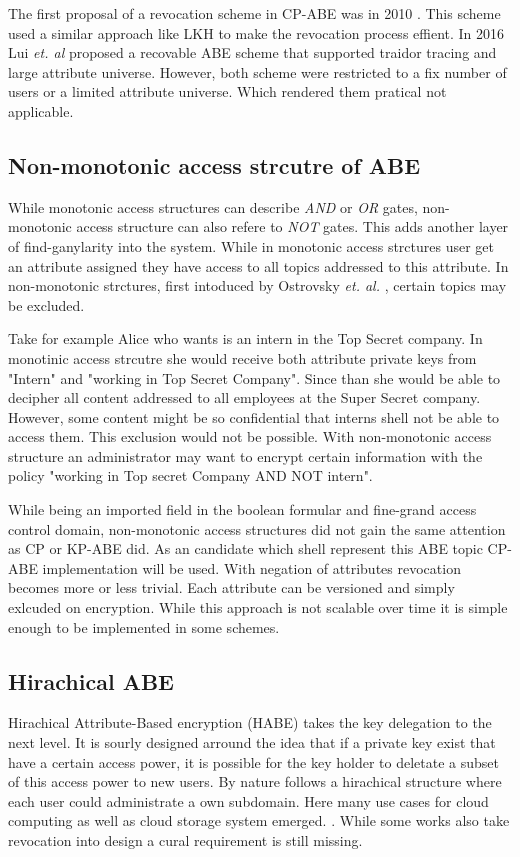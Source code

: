 The first proposal of a revocation scheme in CP-ABE was in 2010 \cite{liang2010ciphertext}. This scheme used a similar approach like LKH to make the revocation process effient. In 2016 Lui \textit{et. al} \cite{liu2016practical} proposed a recovable ABE scheme that supported traidor tracing and large attribute universe. However, both scheme were restricted to a fix number of users or a limited attribute universe. Which rendered them pratical not applicable.  

\subsection{Non-monotonic access strcutre of ABE}
While monotonic access structures can describe \textit{AND} or \textit{OR} gates, non-monotonic access structure can also refere to \textit{NOT} gates. This adds another layer of find-ganylarity into the system. While in monotonic access strctures user get an attribute assigned they have access to all topics addressed to this attribute. In non-monotonic strctures, first intoduced by Ostrovsky \textit{et. al.} \cite{Ostrovsky:2007:AEN:1315245.1315270}, certain topics may be excluded. 

Take for example Alice who wants is an intern in the Top Secret company. In monotinic access strcutre she would receive both attribute private keys from "Intern" and "working in Top Secret Company". Since than she would be able to decipher all content addressed to all employees at the Super Secret company. However, some content might be so confidential that interns shell not be able to access them. This exclusion would not be possible. With non-monotonic access structure an administrator may want to encrypt certain information with the policy "working in Top secret Company AND NOT intern".  

While being an imported field in the boolean formular and fine-grand access control domain, non-monotonic access structures did not gain the same attention as CP or KP-ABE did. As an candidate which shell represent this ABE topic \cite{10.1007/978-3-642-54631-0_16} CP-ABE implementation will be used. With negation of attributes revocation becomes more or less trivial. Each attribute can be versioned and simply exlcuded on encryption. While this approach is not scalable over time it is simple enough to be implemented in some schemes.   

\subsection{Hirachical ABE}
Hirachical Attribute-Based encryption (HABE) takes the key delegation to the next level. It is sourly designed arround the idea that if a private key exist that have a certain access power, it is possible for the key holder to deletate a subset of this access power to new users. By nature follows a hirachical structure where each user could administrate a own subdomain. Here many use cases for cloud computing as well as cloud storage system emerged. \cite{Wang:2010:HAE:1866307.1866414}. While some works also take revocation into design a cural requirement is still missing. 

